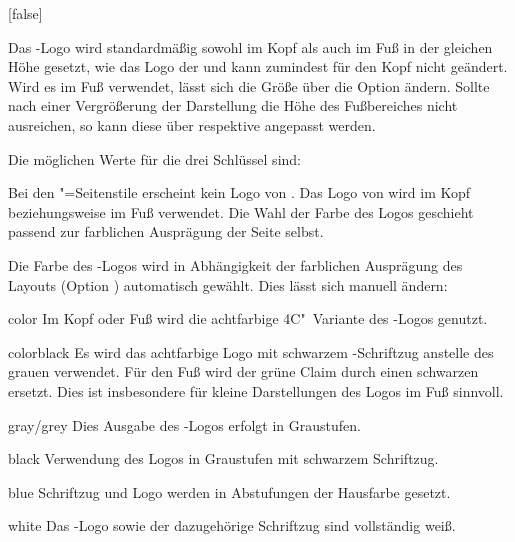 \begin{Declaration*}{}
\begin{Declaration*}{}
\begin{Declaration*}{}
\begin{Declaration}[%
  v2.02:Logo von \DDC automatisch in Kopf/Fuß;%
  v2.02!\Option{ddc=colorblack};
  v2.02!\Option{ddc=gray};
  v2.02!\Option{ddc=black};
  v2.02!\Option{ddc=blue};
  v2.02!\Option{ddc=white};
]{}[false]
\begin{Declaration}[v2.02]{}
\begin{Declaration}[v2.02]{}
Das \DDC-Logo wird standardmäßig sowohl im Kopf als auch im Fuß in der gleichen 
Höhe gesetzt, wie das Logo der \TnUD und kann zumindest für den Kopf nicht 
geändert. Wird es im Fuß verwendet, lässt sich die Größe über die Option 
 ändern. Sollte nach einer Vergrößerung der Darstellung 
die Höhe des Fußbereiches nicht ausreichen, so kann diese über 
 respektive 
 angepasst werden.

Die möglichen Werte für die drei Schlüssel sind:
%
\begin{values}{}
\itemfalse
  Bei den "=Seitenstile erscheint kein Logo von \DDC.
\itemtrue*
  Das Logo von \DDC wird im Kopf beziehungsweise im Fuß verwendet. Die Wahl der 
  Farbe des Logos geschieht passend zur farblichen Ausprägung der Seite selbst.
\end{values}
%
Die Farbe des \DDC-Logos wird in Abhängigkeit der farblichen Ausprägung des 
Layouts (Option ) automatisch gewählt. Dies lässt sich manuell 
ändern:
%
\begin{values}{}
\item[color]
  Im Kopf oder Fuß wird die achtfarbige 4C"~Variante des \DDC-Logos genutzt.
\item[colorblack]
  Es wird das achtfarbige Logo mit schwarzem \DDC-Schriftzug anstelle des 
  grauen verwendet. Für den Fuß wird der grüne Claim durch einen schwarzen 
  ersetzt. Dies ist insbesondere für kleine Darstellungen des Logos im Fuß 
  sinnvoll.
\item[gray/grey]
  Dies Ausgabe des \DDC-Logos erfolgt in Graustufen.
\item[black]
  Verwendung des Logos in Graustufen mit schwarzem Schriftzug.
\item[blue]
  Schriftzug und Logo werden in Abstufungen der Hausfarbe  gesetzt.
\item[white]
  Das \DDC-Logo sowie der dazugehörige Schriftzug sind vollständig weiß.
\end{values}
%
\end{Declaration}
\end{Declaration}
\end{Declaration}


\end{Declaration*}
\end{Declaration*}
\end{Declaration*}
